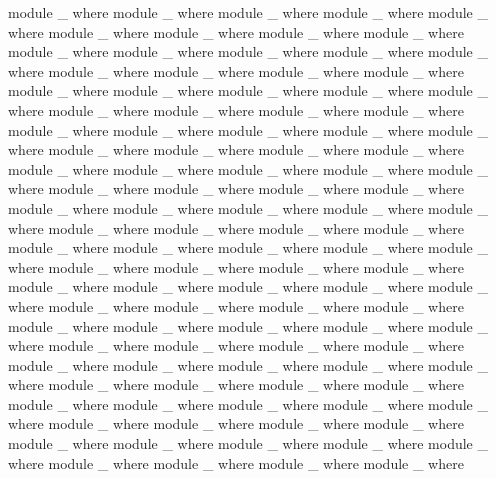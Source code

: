 \documentclass{article}
\begin{document}
\begin{code}
module _ where
module _ where
module _ where
module _ where
module _ where
module _ where
module _ where
module _ where
module _ where
module _ where
module _ where
module _ where
module _ where
module _ where
module _ where
module _ where
module _ where
module _ where
module _ where
module _ where
module _ where
module _ where
module _ where
module _ where
module _ where
module _ where
module _ where
module _ where
module _ where
module _ where
module _ where
module _ where
module _ where
module _ where
module _ where
module _ where
module _ where
module _ where
module _ where
module _ where
module _ where
module _ where
module _ where
module _ where
module _ where
module _ where
module _ where
module _ where
module _ where
module _ where
module _ where
module _ where
module _ where
module _ where
module _ where
module _ where
module _ where
module _ where
module _ where
module _ where
module _ where
module _ where
module _ where
module _ where
module _ where
module _ where
module _ where
module _ where
module _ where
module _ where
module _ where
module _ where
module _ where
module _ where
module _ where
module _ where
module _ where
module _ where
module _ where
module _ where
module _ where
module _ where
module _ where
module _ where
module _ where
module _ where
module _ where
module _ where
module _ where
module _ where
module _ where
module _ where
module _ where
module _ where
module _ where
module _ where
module _ where
module _ where
module _ where
module _ where
module _ where
module _ where
module _ where
module _ where
module _ where
module _ where
module _ where
module _ where
\end{code}
\end{document}
